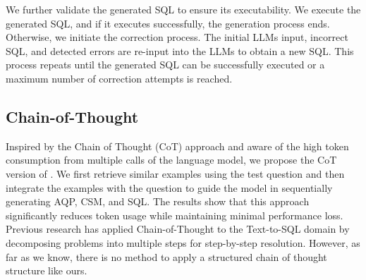 We further validate the generated SQL to ensure its executability.
We execute the generated SQL, and if it executes successfully, the generation process ends. Otherwise, we initiate the correction process.
The initial LLMs input, incorrect SQL, and detected errors are re-input into the LLMs to obtain a new SQL. 
This process repeats until the generated SQL can be successfully executed or a maximum number of correction attempts is reached.


\subsection{Chain-of-Thought}
Inspired by the Chain of Thought (CoT) approach and aware of the high token consumption from multiple calls of the language model, we propose the CoT version of \model. 
We first retrieve similar examples using the test question and then integrate the examples with the question to guide the model in sequentially generating AQP, CSM, and SQL. The results show that this approach significantly reduces token usage while maintaining minimal performance loss.
Previous research has applied Chain-of-Thought to the Text-to-SQL domain by decomposing problems into multiple steps for step-by-step resolution. 
However, as far as we know, there is no method to apply a structured chain of thought structure like ours.
